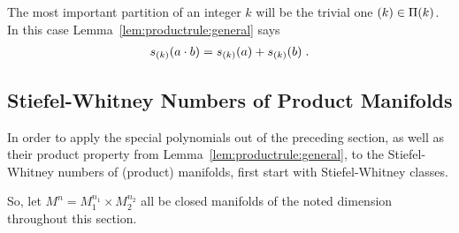 \begin{Ex}
  The most important partition of an integer $k$ will be the trivial
  one $(k)\in\Pi({k})$. In this case
  Lemma~\ref{lem:productrule:general} says
  \begin{gather*}
    s_{(k)}(a\cdot b) = s_{(k)}(a) + s_{(k)}(b)
    \;.
  \end{gather*}
\end{Ex}


\subsection{Stiefel-Whitney Numbers of Product Manifolds}
\label{sec:swnumsofproductmfds}
In order to apply the special polynomials out of the preceding
section, as well as their product property from
Lemma~\ref{lem:productrule:general}, to the Stiefel-Whitney
numbers of (product) manifolds, first start with Stiefel-Whitney
classes.

So, let $M^n=M_1^{n_1}\times M_2^{n_2}$ all be closed manifolds of the
noted dimension throughout this section.

